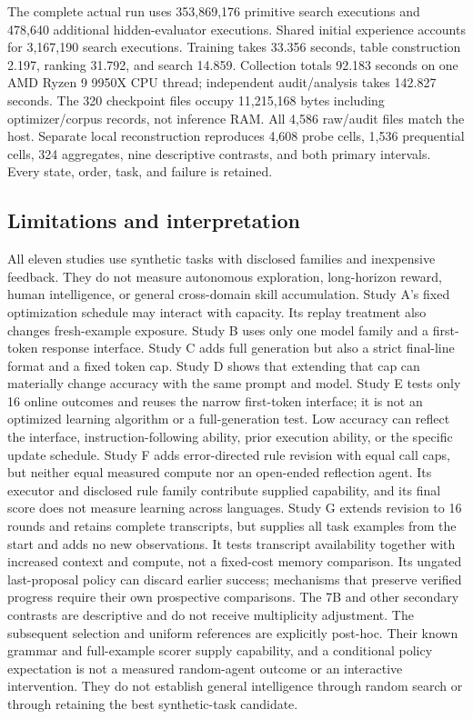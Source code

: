 \documentclass[11pt]{article}
\begin{document}
The complete actual run uses 353,869,176 primitive search executions and
478,640 additional hidden-evaluator executions. Shared initial experience
accounts for 3,167,190 search executions. Training takes 33.356 seconds,
table construction 2.197, ranking 31.792, and search 14.859. Collection totals
92.183 seconds on one AMD Ryzen 9 9950X CPU thread; independent audit/analysis
takes 142.827 seconds. The 320 checkpoint files occupy 11,215,168 bytes
including optimizer/corpus records, not inference RAM. All 4,586 raw/audit
files match the host. Separate local reconstruction reproduces 4,608 probe
cells, 1,536 prequential cells, 324 aggregates, nine descriptive contrasts,
and both primary intervals. Every state, order, task, and failure is retained.

\subsection{Limitations and interpretation}
All eleven studies use synthetic tasks with disclosed families and inexpensive
feedback. They do not measure autonomous exploration, long-horizon reward,
human intelligence, or general cross-domain skill accumulation. Study A's
fixed optimization schedule may interact with capacity. Its replay treatment
also changes fresh-example exposure. Study B uses only one model family and
a first-token response interface. Study C adds full generation but also a
strict final-line format and a fixed token cap. Study D shows that extending that cap can materially
change accuracy with the same prompt and model. Study E tests only 16 online
outcomes and reuses the narrow first-token interface; it is not an optimized
learning algorithm or a full-generation test. Low accuracy can reflect the
interface, instruction-following ability, prior execution ability, or the
specific update schedule. Study F adds error-directed rule revision with
equal call caps, but neither equal measured compute nor an open-ended
reflection agent. Its executor and disclosed rule family contribute supplied
capability, and its final score does not measure learning across languages.
Study G extends revision to 16 rounds and retains complete transcripts,
but supplies all task examples from the start and adds no new observations.
It tests transcript availability together with increased context and compute,
not a fixed-cost memory comparison. Its ungated last-proposal policy can
discard earlier success; mechanisms that preserve verified progress require
their own prospective comparisons. The 7B and other secondary contrasts are
descriptive and do not receive multiplicity adjustment.
The subsequent selection and uniform references are explicitly post-hoc.
Their known grammar and full-example scorer supply capability, and a
conditional policy expectation is not a measured random-agent outcome or
an interactive intervention. They do not establish general intelligence
through random search or through retaining the best synthetic-task candidate.
\end{document}
